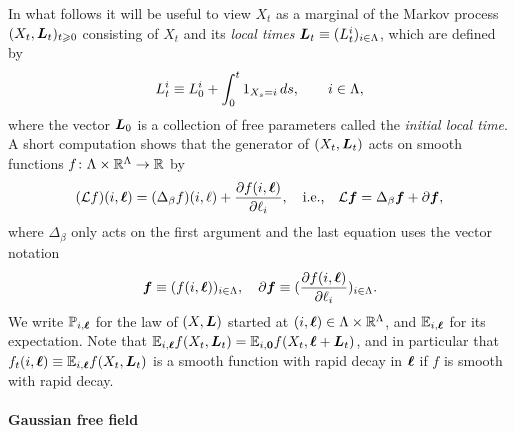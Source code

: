 \documentclass[11pt,a4paper]{article}
\begin{document}
In what follows it will be useful to view $X_t$ as a marginal of the
Markov process $(X_{t},\boldsymbol{L}_{t})_{t\geqslant 0}$ consisting of $X_t$ and its
\emph{local times} $\boldsymbol{L}_{t} \equiv (L^{i}_{t})_{i\in\Lambda}$, which
are defined by 
\begin{equation}
  \label{eq:local}
  L_{t}^{i} \equiv L^{i}_{0}+\int_{0}^{t} 1_{X_{s}=i}\,ds, \qquad i\in\Lambda,
\end{equation}
where the vector $\boldsymbol{L}_{0}$ is a collection of free parameters called
the \emph{initial local time}. A short computation shows that the
generator of $(X_t,\boldsymbol{L}_t)$ acts on smooth functions
$f \colon \Lambda\times\mathbb{R}^{\Lambda}\to \mathbb{R}$ by
\begin{equation}
  \label{eq:SRW-gen}
  (\mathcal L f)(i,\boldsymbol{\ell}) = (\Delta_{\beta}f)(i,\ell) + \frac{\partial f(i,\boldsymbol{\ell})}{\partial \ell_{i}}
  ,\quad \text{i.e.,} \quad
  \mathcal L \boldsymbol{f} = \Delta_\beta \boldsymbol{f} + \partial \boldsymbol{f},
\end{equation}
where $\Delta_\beta$ only acts on the first argument and the last
equation uses the vector notation
\begin{equation} \label{e:vector-ell}
  \boldsymbol{f} \equiv
  (f(i,\boldsymbol{\ell}))_{i\in \Lambda},
  \quad
  \partial\boldsymbol{f} \equiv
  (\frac{\partial f(i,\boldsymbol{\ell})}{\partial \ell_i})_{i\in \Lambda}.
\end{equation}
We write $\mathbb{P}_{i,\boldsymbol{\ell}}$ for the law of $(X,\boldsymbol{L})$ started at
$(i,\boldsymbol{\ell})\in\Lambda\times\mathbb{R}^{\Lambda}$, and $\mathbb{E}_{i,\boldsymbol{\ell}}$ for
its expectation. Note that
$\mathbb{E}_{i,\boldsymbol{\ell}}f(X_t,\boldsymbol{L}_t) = \mathbb{E}_{i,\boldsymbol{0}}f(X_t,\boldsymbol{\ell}+\boldsymbol{L}_t)$,
and in particular that $f_t(i,\boldsymbol{\ell}) \equiv \mathbb{E}_{i,\boldsymbol{\ell}}f(X_t,\boldsymbol{L}_t)$
is a smooth function with rapid decay
in $\boldsymbol{\ell}$ if $f$ is smooth with rapid decay.


\paragraph{Gaussian free field}
\label{sec:GFF}
\end{document}
